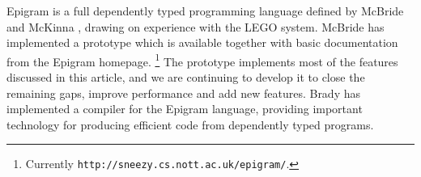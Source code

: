 \documentclass{fundam}
\begin{document}
Epigram is a full dependently typed programming language defined by
McBride and McKinna \cite{ConorJames:vfl}, drawing on experience with
the LEGO system. McBride has implemented a prototype which is
available together with basic documentation
\cite{epigram-man,epigram-afp} from the Epigram homepage.%
\footnote{Currently {\tt http://sneezy.cs.nott.ac.uk/epigram/}.}
The prototype implements most of
the features discussed in this article, and we are continuing to
develop it to close the remaining gaps, improve performance and add
new features. Brady has implemented a compiler
\cite{edwin:thesis,edwin.conor.james:family.indices} for the Epigram
language, providing important technology for producing efficient code
from dependently typed programs.

\newcommand{\general}{\mathrm{g}\RW{eneral}}
\newcommand{\nil}{\DC{nil}}
\newcommand{\cons}{\mbox{\(\;\DC{:\!:}\;\)}}
\newcommand{\tup}{\;\times\;}
\end{document}
